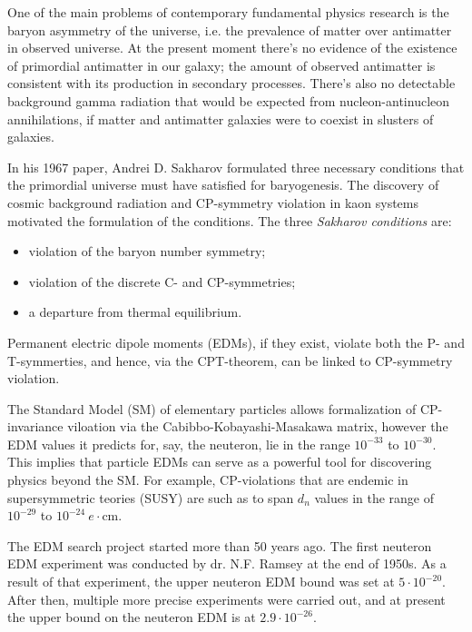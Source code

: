 
One of the main problems of contemporary fundamental physics research is the baryon asymmetry of the universe,
i.e. the prevalence of matter over antimatter in observed universe. At the present moment there's no evidence of the existence of primordial antimatter in our galaxy; the amount of observed antimatter is consistent with its production in secondary processes. There's also no detectable background gamma radiation that would be expected from nucleon-antinucleon annihilations, if matter and antimatter galaxies were to coexist in slusters of galaxies.~\cite{Trodden:Baryogenesis} 

In his 1967 paper, Andrei D. Sakharov formulated three necessary conditions that the primordial universe must have satisfied for baryogenesis. The discovery of cosmic background radiation and CP-symmetry violation in kaon systems~\cite{Fitch:Kaon-CP-violation-1964} motivated the formulation of the conditions. The three \emph{Sakharov conditions} are:
\begin{itemize}
	\item violation of the baryon number symmetry;
	\item violation of the discrete C- and CP-symmetries;
	\item a departure from thermal equilibrium.
\end{itemize}


Permanent electric dipole moments (EDMs), if they exist, violate both the P- and T-symmerties, and hence,
via the CPT-theorem, can be linked to CP-symmetry violation.

The Standard Model (SM) of elementary particles allows formalization of CP-invariance viloation
via the Cabibbo-Kobayashi-Masakawa matrix, however the EDM values it predicts for, say, the neuteron,
lie in the range $10^{-33}$ to $10^{-30}$\ecm.~\cite{Harris:Neutron2007}
This implies that particle EDMs can serve as a powerful tool
for discovering physics beyond the SM. For example, CP-violations that are endemic in
supersymmetric teories (SUSY) are such as to span $d_n$ values in the range of
$10^{-29}$ to $10^{-24}~e\cdot$cm.~\cite{JEDI}

The EDM search project started more than 50 years ago. The first neuteron EDM experiment was conducted by
dr. N.F. Ramsey at the end of 1950s. As a result of that experiment, the upper neuteron EDM bound was set
at $5\cdot 10^{-20}$\ecm.~\cite{Ramsey:Neutron1957} After then, multiple more precise experiments were
carried out, and at present the upper bound on the neuteron EDM is at
$2.9\cdot 10^{-26}$\ecm.~\cite{Baker:nEDM:Main, Baker:nEDM:Reply}

